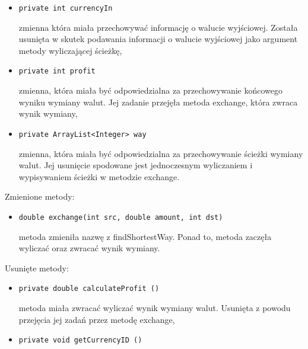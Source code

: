 \documentclass[12pt]{article}
\begin{document}
\begin{enumerate}
    \begin{itemize}
     \item \begin{verbatim}private int currencyIn\end{verbatim}
        zmienna która miała przechowywać informację o walucie wyjściowej. Została usunięta w skutek podawania informacji o walucie wyjściowej jako argument metody wyliczającej ścieżkę,
    \end{itemize}
    \begin{itemize}
     \item \begin{verbatim}private int profit\end{verbatim}
        zmienna, która miała być odpowiedzialna za przechowywanie końcowego wyniku wymiany walut. Jej zadanie przejęła metoda exchange, która zwraca wynik wymiany,
    \end{itemize}
    \begin{itemize}
     \item \begin{verbatim}private ArrayList<Integer> way\end{verbatim}
        zmienna, która miała być odpowiedzialna za przechowywanie ścieżki wymiany walut. Jej usunięcie spodowane jest jednoczesnym wyliczaniem i wypisywaniem ścieżki w metodzie exchange.
    \end{itemize}
    Zmienione metody:
    \begin{itemize}
     \item \begin{verbatim}double exchange(int src, double amount, int dst)\end{verbatim}
        metoda zmieniła nazwę z findShortestWay. Ponad to, metoda zaczęła wyliczać oraz zwracać wynik wymiany.
    \end{itemize}
    Usunięte metody:
    \begin{itemize}
     \item \begin{verbatim}private double calculateProfit ()\end{verbatim}
        metoda miała zwracać wyliczać wynik wymiany walut. Usunięta z powodu przejęcia jej zadań przez metodę exchange,
    \end{itemize}
    \begin{itemize}
     \item \begin{verbatim}private void getCurrencyID ()\end{verbatim}

\end{itemize}
\end{enumerate}
\end{document}
